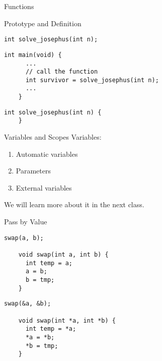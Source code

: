 \begin{frame}{}
  \centerline{\LARGE Functions}
\end{frame}

\begin{frame}[fragile]{Prototype and Definition}
  \begin{lstlisting}[style = Cstyle]
    int solve_josephus(int n);
  \end{lstlisting}

  \vspace{0.20cm}

  \vspace{0.20cm}
  \begin{lstlisting}[style = Cstyle]
    int main(void) {
      ...
      // call the function
      int survivor = solve_josephus(int n);
      ...
    }
  \end{lstlisting}

  \vspace{0.20cm}
  \begin{lstlisting}[style = Cstyle]
    int solve_josephus(int n) {
    }
  \end{lstlisting}
\end{frame}

\begin{frame}[fragile]{Variables and Scopes}
  Variables:
  \begin{enumerate}
    \item Automatic variables
    \item Parameters
    \item External variables
  \end{enumerate}

  \vspace{0.40cm}
  \pause
  \centerline{We will learn more about it in the next class.}

  \vspace{0.60cm}
  \pause
\end{frame}

\begin{frame}[fragile]{Pass by Value}
  \begin{lstlisting}[style = Cstyle]
    swap(a, b);

    void swap(int a, int b) {
      int temp = a;
      a = b;
      b = tmp;
    }
  \end{lstlisting}

  \vspace{0.40cm}
  \pause
  \begin{lstlisting}[style = Cstyle]
    swap(&a, &b);

    void swap(int *a, int *b) {
      int temp = *a;
      *a = *b;
      *b = tmp;
    }
  \end{lstlisting}

  \vspace{0.30cm}
  \pause
\end{frame}
